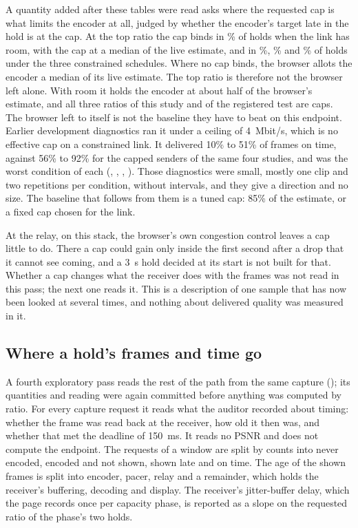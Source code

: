 \ifdefined\NOneDynBindRoom
A quantity added after these tables were read asks where the requested cap is what limits the encoder at all, judged by whether the encoder's target late in the hold is at the cap. At the top ratio the cap binds in \NOneDynBindRoom\% of holds \NOneDynBindRoomT{} when the link has room, with the cap at a median \NOneDynBindCapOverLive{} of the live estimate, and in \NOneDynBindNear\%, \NOneDynBindShallow\% and \NOneDynBindDeep\% of holds under the three constrained schedules. Where no cap binds, the browser allots the encoder a median \NOneDynBrowserShare{} of its live estimate. The top ratio is therefore not the browser left alone. With room it holds the encoder at about half of the browser's estimate, and all three ratios of this study and of the registered test are caps. The browser left to itself is not the baseline they have to beat on this endpoint. Earlier development diagnostics ran it under a ceiling of 4~Mbit/s, which is no effective cap on a constrained link. It delivered 10\% to 51\% of frames on time, against 56\% to 92\% for the capped senders of the same four studies, and was the worst condition of each (, , , ). Those diagnostics were small, mostly one clip and two repetitions per condition, without intervals, and they give a direction and no size. The baseline that follows from them is a tuned cap: 85\% of the estimate, or a fixed cap chosen for the link.
\fi

At the relay, on this stack, the browser's own congestion control leaves a cap little to do. There a cap could gain only inside the first second after a drop that it cannot see coming, and a 3~s hold decided at its start is not built for that. Whether a cap changes what the receiver does with the frames was not read in this pass; the next one reads it. This is a description of one sample that has now been looked at several times, and nothing about delivered quality was measured in it.
\fi

\ifdefined\NOneDelPeers
\subsection{Where a hold's frames and time go}
\label{sec:n1-delivery}
A fourth exploratory pass reads the rest of the path from the same capture (); its quantities and reading were again committed before anything was computed by ratio. For every capture request it reads what the auditor recorded about timing: whether the frame was read back at the receiver, how old it then was, and whether that met the deadline of 150~ms. It reads no PSNR and does not compute the endpoint. The requests of a window are split by counts into never encoded, encoded and not shown, shown late and on time. The age of the shown frames is split into encoder, pacer, relay and a remainder, which holds the receiver's buffering, decoding and display. The receiver's jitter-buffer delay, which the page records once per capacity phase, is reported as a slope on the requested ratio of the phase's two holds.

